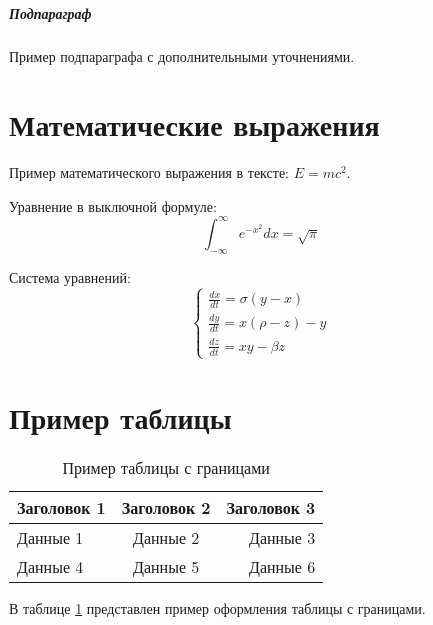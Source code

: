 \subparagraph{Подпараграф} Пример подпараграфа с дополнительными уточнениями.

\section*{Математические выражения}
\label{sec:math}

Пример математического выражения в тексте: $E = mc^2$.

Уравнение в выключной формуле:
\begin{equation}
    \label{eq:1}
    \int_{-\infty}^\infty e^{-x^2} dx = \sqrt{\pi}
\end{equation}

Система уравнений:
\[
\begin{cases}
    \frac{dx}{dt} = \sigma(y - x) \\
    \frac{dy}{dt} = x(\rho - z) - y \\
    \frac{dz}{dt} = xy - \beta z
\end{cases}
\]

\section*{Пример таблицы}
\label{sec:table}

\begin{table}[h]
    \centering
    \caption{Пример таблицы с границами}
    \label{tab:example}
    \begin{tabular}{|l|c|r|}
        \hline
        Заголовок 1 & Заголовок 2 & Заголовок 3 \\
        \hline
        Данные 1 & Данные 2 & Данные 3 \\
        \hline
        Данные 4 & Данные 5 & Данные 6 \\
        \hline
    \end{tabular}
\end{table}

В таблице \ref{tab:example} представлен пример оформления таблицы с границами.